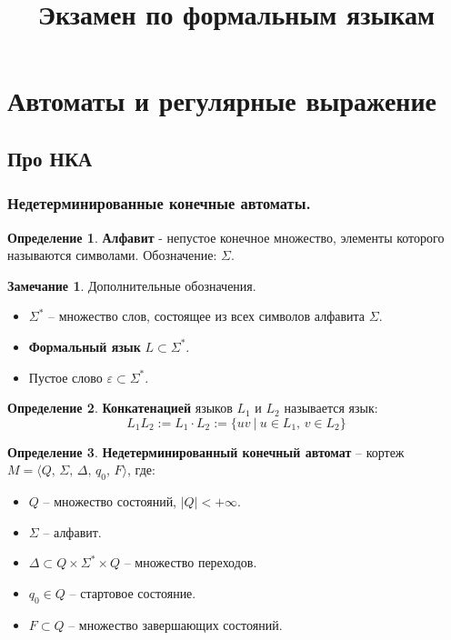 \documentclass[a4paper,12pt]{article}
\title{Экзамен по формальным языкам}
\theoremstyle{plain}
\theoremstyle{definition}
\newtheorem{definition}{Определение}[subsection]
\newtheorem*{note}{Замечание}
\theoremstyle{remark}
\begin{document}
\tableofcontents
\newpage

\section{Автоматы и регулярные выражение}
\subsection{Про НКА}
\subsubsection*{Недетерминированные конечные автоматы.}
\begin{definition}
	\textbf{Алфавит} - непустое конечное множество, элементы которого называются символами. Обозначение: $\Sigma$.
\end{definition}

\begin{note} Дополнительные обозначения.

	\begin{itemize}
		\item $\Sigma^*$ -- множество слов, состоящее из всех символов алфавита $\Sigma$.
		\item \textbf{Формальный язык} $L \subset \Sigma^*$.
		\item Пустое слово $\varepsilon \subset \Sigma^*$.
	\end{itemize}
\end{note}

\begin{definition}
	\textbf{Конкатенацией} языков $L_1$ и $L_2$ называется язык:
	\[
		L_1L_2 := L_1\cdot L_2 := \{uv \:|\: u \in L_1,\, v \in L_2\}
	\]
\end{definition}

\begin{definition}
	\textbf{Недетерминированный конечный автомат} -- кортеж $M = \langle Q,\,\Sigma,\, \Delta,\, q_0,\, F \rangle$, где:
	\begin{itemize}
		\item $Q$ -- множество состояний, $|Q| < +\infty$.
		\item $\Sigma$ -- алфавит.
		\item $\Delta \subset Q \times \Sigma^* \times Q$ -- множество переходов.
		\item $q_0 \in Q$ -- стартовое состояние.
		\item $F \subset Q$ -- множество завершающих состояний.
	\end{itemize}
\end{definition}
\end{document}
